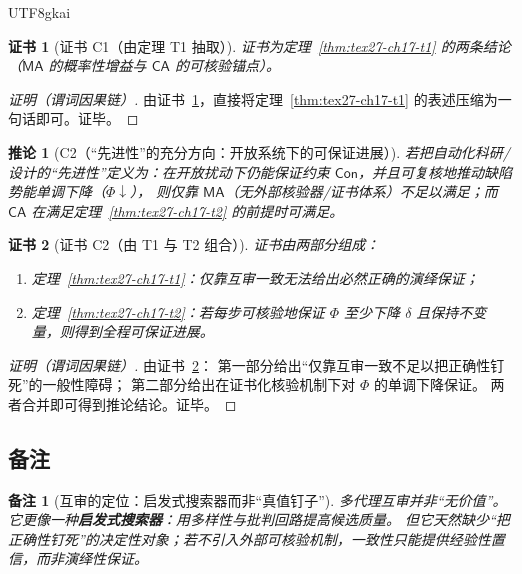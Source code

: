 \documentclass[12pt]{article}
\newtheorem{corollary}{推论}[section]
\newtheorem{remark}{备注}[section]
\newtheorem{Certificate}{证书}[section]
\begin{document}
\begin{CJK*}{UTF8}{gkai}
\begin{Certificate}[证书 C1（由定理 T1 抽取）]
\label{cert:tex27-ch17-c1}
证书为定理~\ref{thm:tex27-ch17-t1} 的两条结论（$\mathsf{MA}$ 的概率性增益与 $\mathsf{CA}$ 的可核验锚点）。
\end{Certificate}

\begin{proof}[证明（谓词因果链）]
由证书~\ref{cert:tex27-ch17-c1}，直接将定理~\ref{thm:tex27-ch17-t1} 的表述压缩为一句话即可。证毕。
\end{proof}

\begin{corollary}[C2（“先进性”的充分方向：开放系统下的可保证进展）]
\label{cor:tex27-ch17-c2}
若把自动化科研/设计的“先进性”定义为：在开放扰动下仍能保证约束 $\mathsf{Con}$，并且可复核地推动缺陷势能单调下降（$\Phi\downarrow$），
则仅靠 $\mathsf{MA}$（无外部核验器/证书体系）不足以满足；而 $\mathsf{CA}$ 在满足定理~\ref{thm:tex27-ch17-t2} 的前提时可满足。
\end{corollary}

\begin{Certificate}[证书 C2（由 T1 与 T2 组合）]
\label{cert:tex27-ch17-c2}
证书由两部分组成：
\begin{enumerate}
  \item 定理~\ref{thm:tex27-ch17-t1}：仅靠互审一致无法给出必然正确的演绎保证；
  \item 定理~\ref{thm:tex27-ch17-t2}：若每步可核验地保证 $\Phi$ 至少下降 $\delta$ 且保持不变量，则得到全程可保证进展。
\end{enumerate}
\end{Certificate}

\begin{proof}[证明（谓词因果链）]
由证书~\ref{cert:tex27-ch17-c2}：
第一部分给出“仅靠互审一致不足以把正确性钉死”的一般性障碍；
第二部分给出在证书化核验机制下对 $\Phi$ 的单调下降保证。
两者合并即可得到推论结论。证毕。
\end{proof}

\subsection{备注}
\label{subsec:tex27-ch17-remarks}

\begin{remark}[互审的定位：启发式搜索器而非“真值钉子”]
多代理互审并非“无价值”。它更像一种\textbf{启发式搜索器}：用多样性与批判回路提高候选质量。
但它天然缺少“把正确性钉死”的决定性对象；若不引入外部可核验机制，一致性只能提供经验性置信，而非演绎性保证。
\end{remark}


\end{CJK*}
\end{document}
